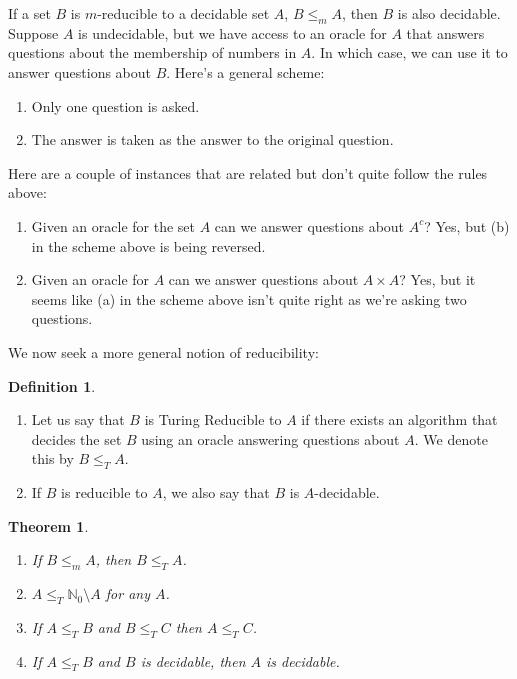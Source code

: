 \documentclass[10pt, letterpaper]{article}
\newcommand{\N}{\mathbb{N}}
\newtheorem{thm}{Theorem}
\theoremstyle{remark}
\theoremstyle{definition}
\newtheorem{defn}{Definition}
\begin{document}
    If a set $B$ is $m$-reducible to a decidable set $A$, $B \leq_m A$, then $B$ is also decidable. Suppose $A$ is undecidable, but we have 
    access to an oracle for $A$ that answers questions about the membership of numbers in $A$. In which case, we can use it to answer 
    questions about $B$. Here's a general scheme:

    \begin{enumerate}
        \item [(a)] Only one question is asked.
        \item [(b)] The answer is taken as the answer to the original question.
    \end{enumerate}

    Here are a couple of instances that are related but don't quite follow the rules above:

    \begin{enumerate}
        \item [(a)] Given an oracle for the set $A$ can we answer questions about $A^c$? Yes, but (b) in the scheme above is being reversed.
        \item [(b)] Given an oracle for $A$ can we answer questions about $A \times A$? Yes, but it seems like (a) in the scheme above isn't quite 
        right as we're asking two questions.
    \end{enumerate}

    We now seek a more general notion of reducibility:

    \begin{defn}
        \begin{enumerate}
            \item [(a)] Let us say that $B$ is Turing Reducible to $A$ if there exists an algorithm that decides the set $B$ using an oracle answering 
            questions about $A$. We denote this by $B \leq_T A$.
            \item [(b)] If $B$ is reducible to $A$, we also say that $B$ is $A$-decidable.
        \end{enumerate}
    \end{defn}

    \begin{thm}
        \begin{enumerate}
            \item [(a)] If $B \leq_m A$, then $B \leq_T A$.
            \item [(b)] $A \leq_T \N_0 \setminus A$ for any $A$.
            \item [(c)] If $A \leq_T B$ and $B \leq_T C$ then $A \leq_T C$.
            \item [(d)] If $A \leq_T B$ and $B$ is decidable, then $A$ is decidable.
        \end{enumerate}
    \end{thm}
\end{document}
